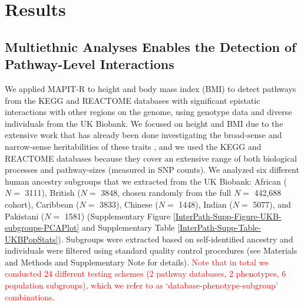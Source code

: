\documentclass[10pt]{article}
\begin{document}

\section*{Results}\label{InterPath-Results}

\subsection*{Multiethnic Analyses Enables the Detection of Pathway-Level Interactions}\label{InterPath-Results-PathwayEpistasis}

We applied MAPIT-R to height and body mass index (BMI) to detect pathways from the KEGG and REACTOME databases \cite{Liberzon2011} with significant epistatic interactions with other regions on the genome, using genotype data and diverse individuals from the UK Biobank. We focused on height and BMI due to the extensive work that has already been done investigating the broad-sense and narrow-sense heritabilities of these traits \cite{Yang2010,Elks2012,Visscher2012,Finucane2015,Speed2017,Wainschtein2019}, and we used the KEGG and REACTOME databases because they cover an extensive range of both biological processes and pathway-sizes (measured in SNP counts). We analyzed six different human ancestry subgroups that we extracted from the UK Biobank: African ($N=$ 3111), British ($N=$ 3848, chosen randomly from the full $N=$ 442,688 cohort), Caribbean ($N=$ 3833), Chinese ($N=$ 1448), Indian ($N=$ 5077), and Pakistani ($N=$ 1581) (Supplementary Figure \ref{InterPath-Supp-Figure-UKB-subgroups-PCAPlot} and Supplementary Table \ref{InterPath-Supp-Table-UKBPopStats}). Subgroups were extracted based on self-identified ancestry and individuals were filtered using standard quality control procedures (see Materials and Methods and Supplementary Note for details). \textcolor{red}{Note that in total we conducted 24 different testing schemes (2 pathway databases, 2 phenotypes, 6 population subgroups), which we refer to as `database-phenotype-subgroup' combinations.}
\end{document}
